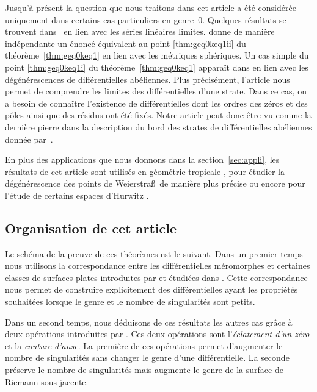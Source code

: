 \documentclass[JEP,XML,SOM,Unicode,francais,NoFloatCountersInSection,published]{cedram}
\newcommand{\Weierstrass}{Weierstra\ss{}}
\theoremstyle{definition}
\begin{document}
Jusqu'à présent la question que nous traitons dans cet article a été considérée uniquement dans certains cas particuliers en genre~$0$. Quelques résultats se trouvent dans~\cite[\S2]{eiha} en lien avec les séries linéaires limites. \cite{Erm} donne de manière indépendante un énoncé équivalent au point \eqref{thm:geq0keq1ii} du théorème~\ref{thm:geq0keq1} en lien avec les métriques sphériques. Un cas simple du point \eqref{thm:geq0keq1i} du théorème~\ref{thm:geq0keq1} apparaît dans \cite[Lem.\,3.6]{BCGGM} en lien avec les dégénérescences de différentielles abéliennes. Plus précisément, l'article \cite{BCGGM} nous permet de comprendre les limites des différentielles d'une strate. Dans ce cas, on a besoin de connaître l'existence de différentielles dont les ordres des zéros et des pôles ainsi que des résidus ont été fixés. Notre article peut donc être vu comme la dernière pierre dans la description du bord des strates de différentielles abéliennes donnée par~\cite{BCGGM}.

En plus des applications que nous donnons dans la section~\ref{sec:appli}, les résultats de cet article sont utilisés en géométrie tropicale \cite{MUW}, pour étudier la dégénérescence des points de \Weierstrass~de manière plus précise \cite{genWei} ou encore pour l'étude de certains espaces d'Hurwitz \cite{mulSecond}.

\subsection{Organisation de cet article}

Le schéma de la preuve de ces théorèmes est le suivant. Dans un premier temps nous utilisons la correspondance entre les différentielles méromorphes et certaines classes de surfaces plates introduites par \cite{Bo} et étudiées dans \cite{tahar}. Cette correspondance nous permet de construire explicitement des différentielles ayant les propriétés souhaitées lorsque le genre et le nombre de singularités sont petits.

Dans un second temps, nous déduisons de ces résultats les autres cas grâce à deux opérations introduites par \cite{kozo}. Ces deux opérations sont l'\emph{éclatement d'un zéro} et la \emph{couture d'anse}. La première de ces opérations permet d'augmenter le nombre de singularités sans changer le genre d'une différentielle. La seconde préserve le nombre de singularités mais augmente le genre de la surface de Riemann sous-jacente.
\end{document}
